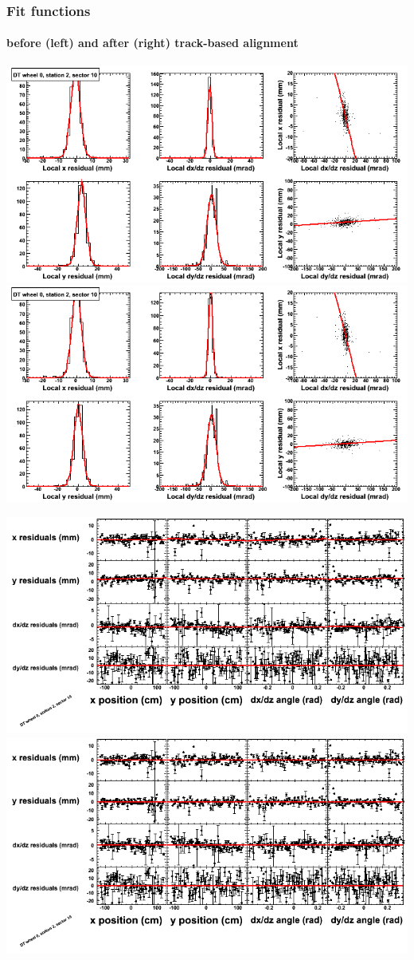 \documentclass[compress]{beamer}
\begin{document}
\begin{frame}
\frametitle{Fit functions}
\framesubtitle{before (left) and after (right) track-based alignment}
\includegraphics[width=0.5\linewidth]{fitfunctions_re01/MBwhCst2sec10_bellcurves.png} \includegraphics[width=0.5\linewidth]{fitfunctions_re05/MBwhCst2sec10_bellcurves.png}

\includegraphics[width=0.5\linewidth]{fitfunctions_re01/MBwhCst2sec10_polynomials.png} \includegraphics[width=0.5\linewidth]{fitfunctions_re05/MBwhCst2sec10_polynomials.png}
\end{frame}
\end{document}
